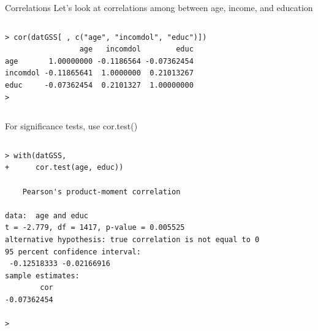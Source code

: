 \documentclass[table,smaller]{beamer}
\begin{document}
\begin{frame}[fragile,label=sec-6-4]{Correlations}
 Let's look at correlations among between age, income, and education
\vspace{-.5em}
\begin{columns}
\begin{block}{}
\begin{verbatim}
> cor(datGSS[ , c("age", "incomdol", "educ")])
                 age   incomdol        educ
age       1.00000000 -0.1186564 -0.07362454
incomdol -0.11865641  1.0000000  0.21013267
educ     -0.07362454  0.2101327  1.00000000
>
\end{verbatim}
\end{block}
\end{columns}
\vspace{.5em}


For significance tests, use cor.test()
\vspace{-.5em}
\begin{columns}
\begin{block}{}
\begin{verbatim}
> with(datGSS,
+      cor.test(age, educ))

	Pearson's product-moment correlation

data:  age and educ
t = -2.779, df = 1417, p-value = 0.005525
alternative hypothesis: true correlation is not equal to 0
95 percent confidence interval:
 -0.12518333 -0.02166916
sample estimates:
        cor 
-0.07362454 

>
\end{verbatim}
\end{block}
\end{columns}
\vspace{.5em}
\end{frame}
\end{document}
